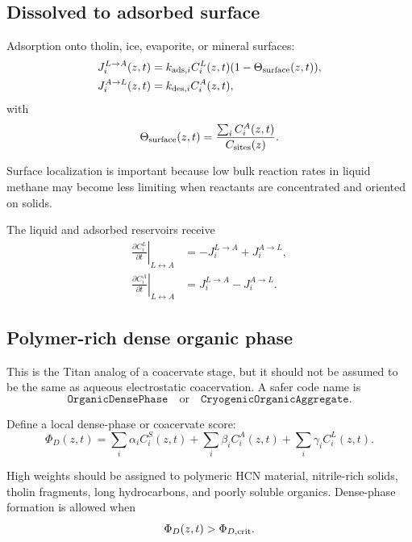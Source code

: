 \documentclass[11pt]{article}
\begin{document}
\subsection{Dissolved to adsorbed surface}

Adsorption onto tholin, ice, evaporite, or mineral surfaces:
\begin{align}
J_i^{L\rightarrow A}(z,t) &= k_{{\rm ads},i} C_i^L(z,t) (1-\Theta_{\rm surface}(z,t)),\\
J_i^{A\rightarrow L}(z,t) &= k_{{\rm des},i} C_i^A(z,t),
\end{align}
with
\begin{equation}
\Theta_{\rm surface}(z,t) = \frac{\sum_i C_i^A(z,t)}{C_{{\rm sites}}(z)}.
\end{equation}

Surface localization is important because low bulk reaction rates in liquid methane may become less limiting when reactants are concentrated and oriented on solids.

The liquid and adsorbed reservoirs receive
\begin{align}
\left.\frac{\partial C_i^L}{\partial t}\right|_{L\leftrightarrow A}
&=
-J_i^{L\rightarrow A}+J_i^{A\rightarrow L},\\
\left.\frac{\partial C_i^A}{\partial t}\right|_{L\leftrightarrow A}
&=
J_i^{L\rightarrow A}-J_i^{A\rightarrow L}.
\end{align}

\subsection{Polymer-rich dense organic phase}

This is the Titan analog of a coacervate stage, but it should not be assumed to be the same as aqueous electrostatic coacervation. A safer code name is
\begin{equation}
\texttt{OrganicDensePhase}
\quad \text{or} \quad
\texttt{CryogenicOrganicAggregate}.
\end{equation}

Define a local dense-phase or coacervate score:
\begin{equation}
\Phi_D(z,t)
=
\sum_i \alpha_i C_i^S(z,t)
+
\sum_i \beta_i C_i^A(z,t)
+
\sum_i \gamma_i C_i^L(z,t).
\end{equation}

High weights should be assigned to polymeric HCN material, nitrile-rich solids, tholin fragments, long hydrocarbons, and poorly soluble organics. Dense-phase formation is allowed when
\begin{equation}
\Phi_D(z,t) > \Phi_{D,\rm crit}.
\end{equation}
\end{document}
